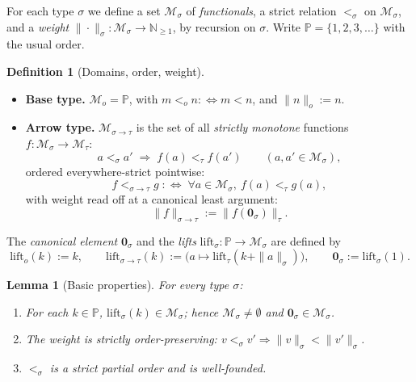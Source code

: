 \documentclass{amsart}
\newtheorem{lemma}{Lemma}
\theoremstyle{definition}
\newtheorem{definition}{Definition}
\begin{document}
For each type $\sigma$ we define a set $\mathcal M_\sigma$ of \emph{functionals}, a
strict relation $<_\sigma$ on $\mathcal M_\sigma$, and a \emph{weight}
$\|\cdot\|_\sigma:\mathcal M_\sigma\to\mathbb N_{\ge 1}$, by recursion on $\sigma$.
Write $\mathbb P=\{1,2,3,\dots\}$ with the usual order.

\begin{definition}[Domains, order, weight]\label{def:dom}
\leavevmode
\begin{itemize}
\item \textbf{Base type.}
  $\mathcal M_o=\mathbb P$, with $m<_o n :\Leftrightarrow m<n$, and $\|n\|_o:=n$.
\item \textbf{Arrow type.}
  $\mathcal M_{\sigma\to\tau}$ is the set of all \emph{strictly monotone} functions
  $f:\mathcal M_\sigma\to\mathcal M_\tau$:
  \[
    a<_\sigma a' \;\Longrightarrow\; f(a)<_\tau f(a')
    \qquad(a,a'\in\mathcal M_\sigma),
  \]
  ordered everywhere-strict pointwise:
  \[
    f<_{\sigma\to\tau}g \;:\Leftrightarrow\;
    \forall a\in\mathcal M_\sigma,\ f(a)<_\tau g(a),
  \]
  with weight read off at a canonical least argument:
  \[
    \|f\|_{\sigma\to\tau}:=\|f(\mathbf 0_\sigma)\|_\tau .
  \]
\end{itemize}
The \emph{canonical element} $\mathbf 0_\sigma$ and the \emph{lifts}
$\mathrm{lift}_\sigma:\mathbb P\to\mathcal M_\sigma$ are defined by
\[
  \mathrm{lift}_o(k):=k,\qquad
  \mathrm{lift}_{\sigma\to\tau}(k):=\bigl(a\mapsto\mathrm{lift}_\tau(k+\|a\|_\sigma)\bigr),
  \qquad \mathbf 0_\sigma:=\mathrm{lift}_\sigma(1).
\]
\end{definition}

\begin{lemma}[Basic properties]\label{lem:basic}
For every type $\sigma$:
\begin{enumerate}
\item[(a)] For each $k\in\mathbb P$, $\mathrm{lift}_\sigma(k)\in\mathcal M_\sigma$;
  hence $\mathcal M_\sigma\neq\emptyset$ and $\mathbf 0_\sigma\in\mathcal M_\sigma$.
\item[(b)] The weight is strictly order-preserving:
  $v<_\sigma v'\Rightarrow\|v\|_\sigma<\|v'\|_\sigma$.
\item[(c)] $<_\sigma$ is a strict partial order and is well-founded.
\end{enumerate}
\end{lemma}
\end{document}
